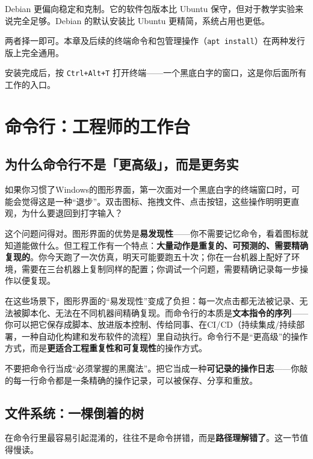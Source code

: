 \documentclass[11pt,a4paper]{article}
\begin{document}
Debian 更偏向稳定和克制。它的软件包版本比 Ubuntu 保守，但对于教学实验来说完全足够。Debian 的默认安装比 Ubuntu 更精简，系统占用也更低。

两者择一即可。本章及后续的终端命令和包管理操作（\texttt{apt install}）在两种发行版上完全通用。

安装完成后，按 \texttt{Ctrl+Alt+T} 打开终端——一个黑底白字的窗口，这是你后面所有工作的入口。

\section{命令行：工程师的工作台}

\subsection{为什么命令行不是「更高级」，而是更务实}

如果你习惯了Windows的图形界面，第一次面对一个黑底白字的终端窗口时，可能会觉得这是一种``退步''。双击图标、拖拽文件、点击按钮，这些操作明明更直观，为什么要退回到打字输入？

这个问题问得对。图形界面的优势是\textbf{易发现性}——你不需要记忆命令，看着图标就知道能做什么。但工程工作有一个特点：\textbf{大量动作是重复的、可预测的、需要精确复现的}。你今天跑了一次仿真，明天可能要跑五十次；你在一台机器上配好了环境，需要在三台机器上复制同样的配置；你调试一个问题，需要精确记录每一步操作以便复现。

在这些场景下，图形界面的``易发现性''变成了负担：每一次点击都无法被记录、无法被脚本化、无法在不同机器间精确复现。而命令行的本质是\textbf{文本指令的序列}——你可以把它保存成脚本、放进版本控制、传给同事、在CI/CD（持续集成/持续部署，一种自动化构建和发布软件的流程）里自动执行。命令行不是``更高级''的操作方式，而是\textbf{更适合工程重复性和可复现性}的操作方式。

\begin{tipbox}
不要把命令行当成``必须掌握的黑魔法''。把它当成一种\textbf{可记录的操作日志}——你敲的每一行命令都是一条精确的操作记录，可以被保存、分享和重放。
\end{tipbox}

\subsection{文件系统：一棵倒着的树}

在命令行里最容易引起混淆的，往往不是命令拼错，而是\textbf{路径理解错了}。这一节值得慢读。
\end{document}
